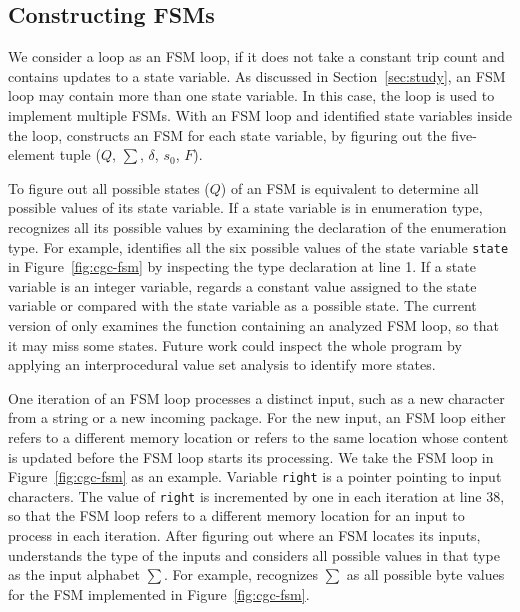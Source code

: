 \vspace{-0.1in}

\subsection{Constructing FSMs}
\label{sec:tuple}
We consider a loop as an FSM loop, if it does not take a constant trip count 
and contains updates to a state variable.
As discussed in Section~\ref{sec:study}, 
an FSM loop may contain more than one state variable. 
In this case, the loop is used to implement multiple FSMs.
With an FSM loop and identified state variables inside the loop, 
\Tool{} constructs an FSM for each state variable, 
by figuring out the five-element 
tuple ($Q$, $\sum$, $\delta$, $s_0$, $F$). 

To figure out all possible states ($Q$) of an FSM 
is equivalent to determine all possible values of its state variable. 
If a state variable is in enumeration type, 
\Tool{} recognizes all its possible values 
by examining the declaration of the enumeration type. 
For example, \Tool{} identifies all the six possible values of 
the state variable \texttt{state} in Figure~\ref{fig:cgc-fsm} 
by inspecting the type declaration at line 1. 
If a state variable is an integer variable, \Tool{} regards 
a constant value assigned to the state variable or 
compared with the state variable as a possible state. 
The current version of \Tool{} only examines the function
containing an analyzed FSM loop, so that it may miss some states. 
Future work could inspect the whole program by 
applying an interprocedural 
value set analysis to identify more states. 

One iteration of an FSM loop processes a distinct input, 
such as a new character from a string or a new incoming package. 
For the new input, an FSM loop either refers to a different memory location 
or refers to the same location whose content is updated before 
the FSM loop starts its processing. 
We take the FSM loop in Figure~\ref{fig:cgc-fsm} as an example.
Variable \texttt{right} is a pointer pointing to input characters.
The value of \texttt{right} is incremented by one in each iteration at line 38, 
so that the FSM loop refers to a different memory location 
for an input to process in each iteration.  
After figuring out where an FSM locates its inputs, 
\Tool{} understands the type of the inputs 
and considers all possible values in that type
as the input alphabet $\sum$. For example, \Tool{} recognizes 
$\sum$ as all possible byte values 
for the FSM implemented in Figure~\ref{fig:cgc-fsm}. 

